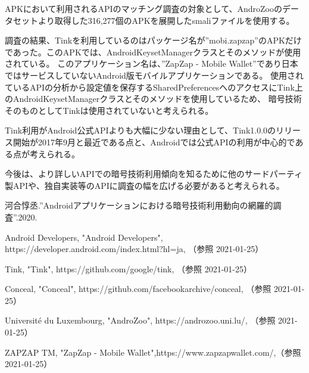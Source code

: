 \documentclass[twocolumn, 10pt, a4paper]{jarticle}
\begin{document}
APKにおいて利用されるAPIのマッチング調査の対象として、AndroZoo\cite{AndroZoo}のデータセットより取得した316,277個のAPKを展開したsmaliファイルを使用する。

調査の結果、Tinkを利用しているのはパッケージ名が''mobi.zapzap''のAPKだけであった。このAPKでは、AndroidKeysetManagerクラスとそのメソッドが使用されている。
このアプリケーション名は、''ZapZap - Mobile Wallet''\cite{ZapZap}であり日本ではサービスしていないAndroid版モバイルアプリケーションである。
使用されているAPIの分析から設定値を保存するSharedPreferencesへのアクセスにTink上のAndroidKeysetManagerクラスとそのメソッドを使用しているため、
暗号技術そのものとしてTinkは使用されていないと考えられる。

Tink利用がAndroid公式APIよりも大幅に少ない理由として、Tink1.0.0のリリース開始が2017年9月と最近である点と、Androidでは公式APIの利用が中心的である点が考えられる。

今後は、より詳しいAPIでの暗号技術利用傾向を知るために他のサードパーティ製APIや、独自実装等のAPIに調査の幅を広げる必要があると考えられる。



\begin{thebibliography}{10}

河合惇丞.''Androidアプリケーションにおける暗号技術利用動向の網羅的調査''.2020.

Android Developers, "Android Developers", https://developer.android.com/index.html?hl=ja, （参照 2021-01-25）

Tink, "Tink", https://github.com/google/tink, （参照 2021-01-25）

Conceal, "Conceal", https://github.com/facebookarchive/conceal, （参照 2021-01-25）

Université du Luxembourg, "AndroZoo",  https://androzoo.uni.lu/, （参照 2021-01-25）

ZAPZAP TM, "ZapZap - Mobile Wallet",https://www.zapzapwallet.com/,（参照 2021-01-25）
\end{thebibliography}
\end{document}
